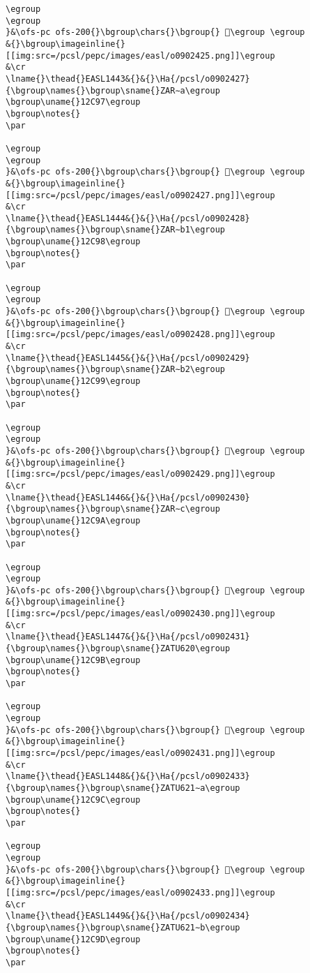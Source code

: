 \begin{verbatim}
\egroup
\egroup
}&\ofs-pc ofs-200{}\bgroup\chars{}\bgroup{} 𒲖\egroup \egroup
&{}\bgroup\imageinline{}[[img:src=/pcsl/pepc/images/easl/o0902425.png]]\egroup
&\cr
\lname{}\thead{}EASL1443&{}&{}\Ha{/pcsl/o0902427}{\bgroup\names{}\bgroup\sname{}ZAR∼a\egroup
\bgroup\uname{}12C97\egroup
\bgroup\notes{}
\par 

\egroup
\egroup
}&\ofs-pc ofs-200{}\bgroup\chars{}\bgroup{} 𒲗\egroup \egroup
&{}\bgroup\imageinline{}[[img:src=/pcsl/pepc/images/easl/o0902427.png]]\egroup
&\cr
\lname{}\thead{}EASL1444&{}&{}\Ha{/pcsl/o0902428}{\bgroup\names{}\bgroup\sname{}ZAR∼b1\egroup
\bgroup\uname{}12C98\egroup
\bgroup\notes{}
\par 

\egroup
\egroup
}&\ofs-pc ofs-200{}\bgroup\chars{}\bgroup{} 𒲘\egroup \egroup
&{}\bgroup\imageinline{}[[img:src=/pcsl/pepc/images/easl/o0902428.png]]\egroup
&\cr
\lname{}\thead{}EASL1445&{}&{}\Ha{/pcsl/o0902429}{\bgroup\names{}\bgroup\sname{}ZAR∼b2\egroup
\bgroup\uname{}12C99\egroup
\bgroup\notes{}
\par 

\egroup
\egroup
}&\ofs-pc ofs-200{}\bgroup\chars{}\bgroup{} 𒲙\egroup \egroup
&{}\bgroup\imageinline{}[[img:src=/pcsl/pepc/images/easl/o0902429.png]]\egroup
&\cr
\lname{}\thead{}EASL1446&{}&{}\Ha{/pcsl/o0902430}{\bgroup\names{}\bgroup\sname{}ZAR∼c\egroup
\bgroup\uname{}12C9A\egroup
\bgroup\notes{}
\par 

\egroup
\egroup
}&\ofs-pc ofs-200{}\bgroup\chars{}\bgroup{} 𒲚\egroup \egroup
&{}\bgroup\imageinline{}[[img:src=/pcsl/pepc/images/easl/o0902430.png]]\egroup
&\cr
\lname{}\thead{}EASL1447&{}&{}\Ha{/pcsl/o0902431}{\bgroup\names{}\bgroup\sname{}ZATU620\egroup
\bgroup\uname{}12C9B\egroup
\bgroup\notes{}
\par 

\egroup
\egroup
}&\ofs-pc ofs-200{}\bgroup\chars{}\bgroup{} 𒲛\egroup \egroup
&{}\bgroup\imageinline{}[[img:src=/pcsl/pepc/images/easl/o0902431.png]]\egroup
&\cr
\lname{}\thead{}EASL1448&{}&{}\Ha{/pcsl/o0902433}{\bgroup\names{}\bgroup\sname{}ZATU621∼a\egroup
\bgroup\uname{}12C9C\egroup
\bgroup\notes{}
\par 

\egroup
\egroup
}&\ofs-pc ofs-200{}\bgroup\chars{}\bgroup{} 𒲜\egroup \egroup
&{}\bgroup\imageinline{}[[img:src=/pcsl/pepc/images/easl/o0902433.png]]\egroup
&\cr
\lname{}\thead{}EASL1449&{}&{}\Ha{/pcsl/o0902434}{\bgroup\names{}\bgroup\sname{}ZATU621∼b\egroup
\bgroup\uname{}12C9D\egroup
\bgroup\notes{}
\par 


\end{verbatim}
